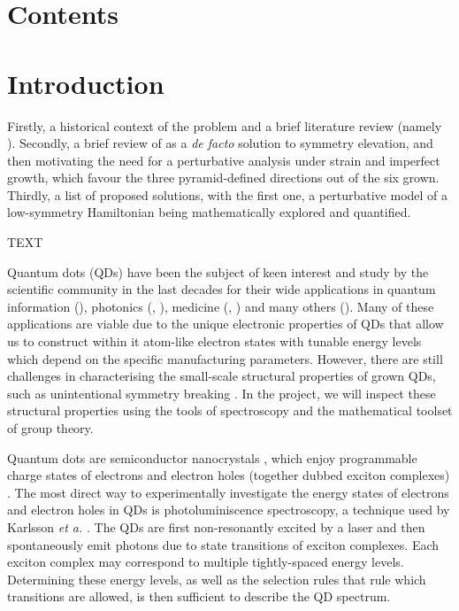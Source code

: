 \documentclass[12pt]{article}
\begin{document}
\pagebreak

\section{Contents}


\renewcommand\contentsname{}

\begingroup
\let\clearpage\relax
\vspace{-1cm} %
\tableofcontents
\endgroup

\pagebreak

\section{Introduction}

Firstly, a historical context of the problem and a brief literature review (namely \cite{karlsson}). Secondly, a brief review of \cite{hexagon} as a \textit{de facto} solution to symmetry elevation, and then motivating the need for a perturbative analysis under strain and imperfect growth, which favour the three pyramid-defined directions out of the six grown. Thirdly, a list of proposed solutions, with the first one, a perturbative model of a low-symmetry Hamiltonian being mathematically explored and quantified.

TEXT

Quantum dots (QDs) have been the subject of keen interest and study by the scientific community in the last decades for their wide applications in quantum information (\cite{quantum_information1}), photonics (\cite{photonics1}, \cite{photonics2}), medicine (\cite{medicine1}, \cite{medicine2}) and many others (\cite{other_applications}). Many of these applications are viable due to the unique electronic properties of QDs that allow us to construct within it atom-like electron states \cite{atomlike} with tunable energy levels \cite{tunable} which depend on the specific manufacturing parameters. However, there are still challenges in characterising the small-scale structural properties of grown QDs, such as unintentional symmetry breaking \cite{karlsson}. In the project, we will inspect these structural properties using the tools of spectroscopy and the mathematical toolset of group theory.

Quantum dots are semiconductor nanocrystals \cite{other_applications}, which enjoy programmable charge states of electrons and electron holes (together dubbed exciton complexes) \cite{charge_state}. The most direct way to experimentally investigate the energy states of electrons and electron holes in QDs is photoluminiscence spectroscopy, a technique used by Karlsson \textit{et a.} \cite{karlsson}. The QDs are first non-resonantly excited by a laser and then spontaneously emit photons due to state transitions of exciton complexes. Each exciton complex may correspond to multiple tightly-spaced energy levels. Determining these energy levels, as well as the selection rules that rule which transitions are allowed, is then sufficient to describe the QD spectrum.
\end{document}
